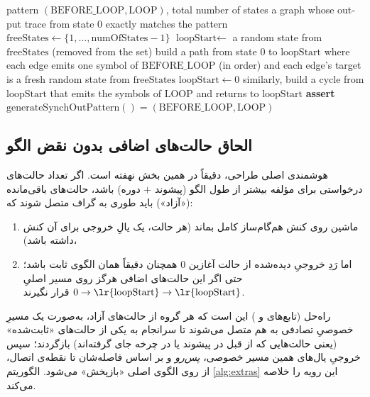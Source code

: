 \documentclass[a4paper,12pt]{article}
\numberwithin{algorithm}{section}
\begin{document}
\begin{algorithm}[H]
\caption{}
\label{alg:skeleton}
\begin{latin}
\begin{algorithmic}[1]
\REQUIRE pattern $(\text{BEFORE\_LOOP}, \text{LOOP})$, total number of states
\ENSURE a graph whose output trace from state $0$ exactly matches the pattern
\STATE $\text{freeStates} \leftarrow \{1, \dots, \text{numOfStates}-1\}$
    \STATE $\text{loopStart} \leftarrow$ a random state from $\text{freeStates}$ (removed from the set)
    \STATE build a path from state $0$ to $\text{loopStart}$ where each edge emits one symbol of $\text{BEFORE\_LOOP}$ (in order) and each edge's target is a fresh random state from $\text{freeStates}$
\ELSE
    \STATE $\text{loopStart} \leftarrow 0$
\ENDIF
\STATE similarly, build a cycle from $\text{loopStart}$ that emits the symbols of $\text{LOOP}$ and returns to $\text{loopStart}$
\STATE {}
\STATE \textbf{assert} $\text{generateSynchOutPattern}() = (\text{BEFORE\_LOOP}, \text{LOOP})$
\end{algorithmic}
\end{latin}
\end{algorithm}

\subsection{الحاق حالت‌های اضافی بدون نقض الگو}
هوشمندی اصلی طراحی، دقیقاً در همین بخش نهفته است. اگر تعداد حالت‌های درخواستی برای مؤلفه بیشتر از طول الگو (پیشوند $+$ دوره) باشد، حالت‌های باقی‌مانده («آزاد») باید طوری به گراف متصل شوند که:
\begin{enumerate}
	\item ماشین روی کنش هم‌گام‌ساز کامل بماند (هر حالت، یک یالِ خروجی برای آن کنش داشته باشد)،
	\item اما رَدِ خروجیِ دیده‌شده از حالت آغازین $0$ همچنان دقیقاً همان الگوی ثابت باشد؛ حتی اگر این حالت‌های اضافی هرگز روی مسیر اصلیِ $0\to\text{\lr{loopStart}}\to\text{\lr{loopStart}}$ قرار نگیرند.
\end{enumerate}
راه‌حل (تابع‌های  و ) این است که هر گروه از حالت‌های آزاد، به‌صورت یک مسیرِ خصوصیِ تصادفی به هم متصل می‌شوند تا سرانجام به یکی از حالت‌های «ثابت‌شده» (یعنی حالت‌هایی که از قبل در پیشوند یا در چرخه جای گرفته‌اند) بازگردند؛ سپس خروجیِ یال‌های همین مسیر خصوصی، \emph{پس‌رو} و بر اساس فاصله‌شان تا نقطه‌ی اتصال، از روی الگوی اصلی «بازپخش» می‌شود. الگوریتم \ref{alg:extras} این رویه را خلاصه می‌کند.
\end{document}
